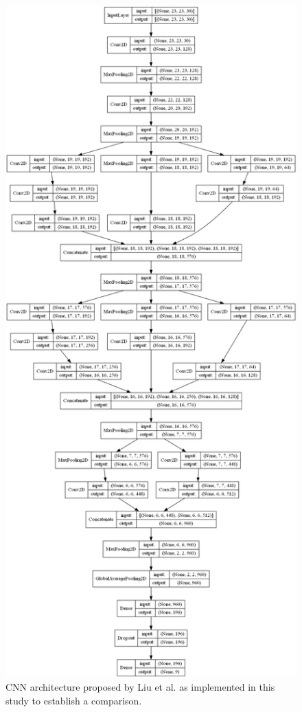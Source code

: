 \begin{figure}[ht]
    \centering
    \includegraphics[width=\linewidth]{figs/vineyard_classification/networks/lt_cnn_23x22_64.png}
	\caption{CNN architecture proposed by Liu et al. \cite{liu_plant_2022} as implemented in this study to establish a comparison. }
	\label{fig:lt_cnn}
\end{figure}

